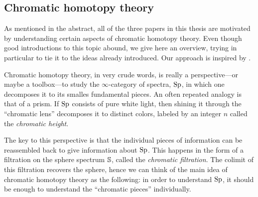 

\subsection{Chromatic homotopy theory}
\label{ch0:ssec:chromatic-homotopy-theory}

As mentioned in the abstract, all of the three papers in this thesis are motivated by understanding certain aspects of chromatic homotopy theory. Even though good introductions to this topic abound, we give here an overview, trying in particular to tie it to the ideas already introduced. Our approach is inspired by \cite{barthel-beaudry_19}. 

Chromatic homotopy theory, in very crude words, is really a perspective---or maybe a toolbox---to study the $\infty$-category of spectra, $\Sp$, in which one decomposes it to its smalles fundamental pieces. An often repeated analogy is that of a prism. If $\Sp$ consists of pure white light, then shining it through the ``chromatic lens'' decomposes it to distinct colors, labeled by an integer $n$ called the \emph{chromatic height}. 

\begin{center}
\end{center}

The key to this perspective is that the individual pieces of information can be reassembled back to give information about $\Sp$. This happens in the form of a filtration on the sphere spectrum $\S$, called the \emph{chromatic filtration}. The colimit of this filtration recovers the sphere, hence we can think of the main idea of chromatic homotopy theory as the following: in order to understand $\Sp$, it should be enough to understand the ``chromatic pieces'' individually. 

